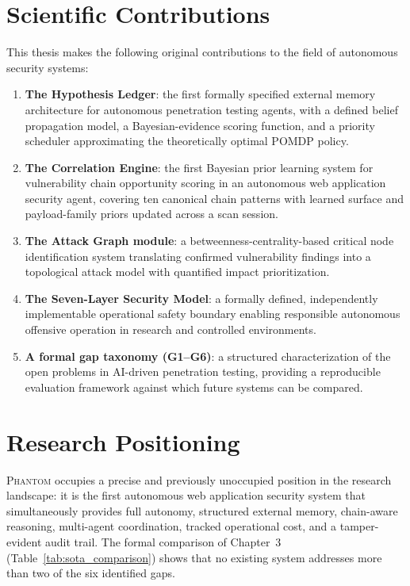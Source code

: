 \documentclass[12pt,a4paper,oneside,openany]{book}
\newcommand{\Phantom}{\textsc{Phantom}}
\begin{document}
\section{Scientific Contributions}

This thesis makes the following original contributions to the field of autonomous security systems:

\begin{enumerate}
\item \textbf{The Hypothesis Ledger}: the first formally specified external memory architecture for autonomous penetration testing agents, with a defined belief propagation model, a Bayesian-evidence scoring function, and a priority scheduler approximating the theoretically optimal POMDP policy.

\item \textbf{The Correlation Engine}: the first Bayesian prior learning system for vulnerability chain opportunity scoring in an autonomous web application security agent, covering ten canonical chain patterns with learned surface and payload-family priors updated across a scan session.

\item \textbf{The Attack Graph module}: a betweenness-centrality-based critical node identification system translating confirmed vulnerability findings into a topological attack model with quantified impact prioritization.

\item \textbf{The Seven-Layer Security Model}: a formally defined, independently implementable operational safety boundary enabling responsible autonomous offensive operation in research and controlled environments.

\item \textbf{A formal gap taxonomy (G1--G6)}: a structured characterization of the open problems in AI-driven penetration testing, providing a reproducible evaluation framework against which future systems can be compared.
\end{enumerate}

\section{Research Positioning}

\Phantom{} occupies a precise and previously unoccupied position in the research landscape: it is the first autonomous web application security system that simultaneously provides full autonomy, structured external memory, chain-aware reasoning, multi-agent coordination, tracked operational cost, and a tamper-evident audit trail. The formal comparison of Chapter~3 (Table~\ref{tab:sota_comparison}) shows that no existing system addresses more than two of the six identified gaps.
\end{document}
